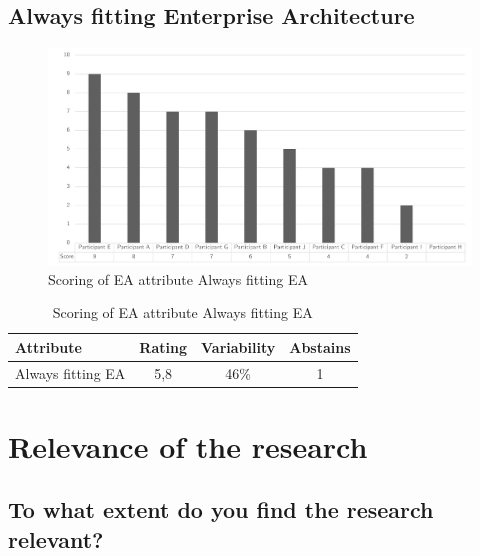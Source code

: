 \subsection{Always fitting Enterprise Architecture}
\begin{figure}[H]
	\centering
	\includegraphics[width=0.9\linewidth]{images/scoreeaalwaysfitea}
	\caption[Scoring of EA attribute Always fitting EA]{Scoring of EA attribute Always fitting EA}
	\label{fig:appscoringeaalwaysfitea}
\end{figure}
\begin{table}[h!]
	\centering
	\begin{tabular}{p{}ccc}
		\toprule
		\textbf{Attribute} & \textbf{Rating} & \textbf{Variability} & \textbf{Abstains} \\
		\midrule
		Always fitting EA & 5,8 & 46\% & 1 \\%
		\bottomrule
	\end{tabular}%
	\caption[Scoring of EA attribute Always fitting EA]{Scoring of EA attribute Always fitting EA}
	\label{tab:appscoringeaalwaysfitea}%
\end{table}%




\section{Relevance of the research}
\label{sec:relevanceofresearchandexpectations}

\subsection{To what extent do you find the research relevant?}
\label{sub:relevantgeneric}

